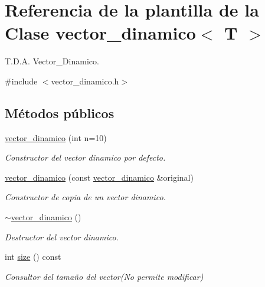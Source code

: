 \hypertarget{classvector__dinamico}{}\section{Referencia de la plantilla de la Clase vector\+\_\+dinamico$<$ T $>$}
\label{classvector__dinamico}


T.\+D.\+A. Vector\+\_\+\+Dinamico.  




{\ttfamily \#include $<$vector\+\_\+dinamico.\+h$>$}

\subsection*{Métodos públicos}
\begin{DoxyCompactItemize}
\item 
\hyperlink{classvector__dinamico_ad32cc31634a714ac416d8f711fde4c4b}{vector\+\_\+dinamico} (int n=10)
\begin{DoxyCompactList}\small\item\em Constructor del vector dinamico por defecto. \end{DoxyCompactList}\item 
\hyperlink{classvector__dinamico_a9408bb09596374eabcbebe495f9dd2c6}{vector\+\_\+dinamico} (const \hyperlink{classvector__dinamico}{vector\+\_\+dinamico} \&original)
\begin{DoxyCompactList}\small\item\em Constructor de copia de un vector dinamico. \end{DoxyCompactList}\item 
\mbox{\label{classvector__dinamico_a34bd35e2c52735888f57bfbc19da1eac}} 
\hyperlink{classvector__dinamico_a34bd35e2c52735888f57bfbc19da1eac}{$\sim$vector\+\_\+dinamico} ()
\begin{DoxyCompactList}\small\item\em Destructor del vector dinamico. \end{DoxyCompactList}\item 
int \hyperlink{classvector__dinamico_a196f12479a340f66a26e59eadec6e4e6}{size} () const
\begin{DoxyCompactList}\small\item\em Consultor del tamaño del vector(\+No permite modificar) \end{DoxyCompactList}\item 

\end{DoxyCompactItemize}
